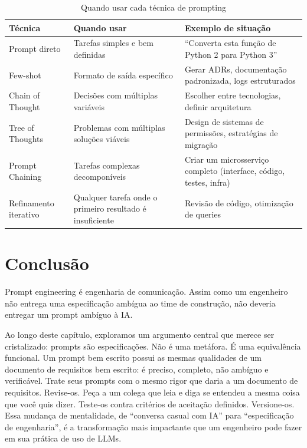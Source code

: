 \begin{table}[ht]
\centering
\caption{Quando usar cada técnica de prompting}
\begin{tabular}{@{}p{3.5cm}p{3.5cm}p{5cm}@{}}
\toprule
\textbf{Técnica} & \textbf{Quando usar} & \textbf{Exemplo de situação} \\
\midrule
Prompt direto & Tarefas simples e bem definidas & ``Converta esta função de
    Python 2 para Python 3'' \\
\addlinespace
Few-shot & Formato de saída específico & Gerar ADRs, documentação
    padronizada, logs estruturados \\
\addlinespace
Chain of Thought & Decisões com múltiplas variáveis & Escolher entre
    tecnologias, definir arquitetura \\
\addlinespace
Tree of Thoughts & Problemas com múltiplas soluções viáveis & Design de
    sistemas de permissões, estratégias de migração \\
\addlinespace
Prompt Chaining & Tarefas complexas decomponíveis & Criar um microsserviço
    completo (interface, código, testes, infra) \\
\addlinespace
Refinamento iterativo & Qualquer tarefa onde o primeiro resultado é
    insuficiente & Revisão de código, otimização de queries \\
\bottomrule
\end{tabular}
\end{table}

\section{Conclusão}

Prompt engineering é engenharia de comunicação. Assim como um engenheiro não
entrega uma especificação ambígua ao time de construção, não deveria entregar
um prompt ambíguo à IA.

Ao longo deste capítulo, exploramos um argumento central que merece ser
cristalizado: prompts são especificações. Não é uma metáfora. É uma
equivalência funcional. Um prompt bem escrito possui as mesmas qualidades de um
documento de requisitos bem escrito: é preciso, completo, não ambíguo e
verificável. Trate seus prompts com o mesmo rigor que daria a um documento de
requisitos. Revise-os. Peça a um colega que leia e diga se entendeu a mesma
coisa que você quis dizer. Teste-os contra critérios de aceitação definidos.
Versione-os. Essa mudança de mentalidade, de ``conversa casual com IA'' para
``especificação de engenharia'', é a transformação mais impactante que um
engenheiro pode fazer em sua prática de uso de LLMs.

